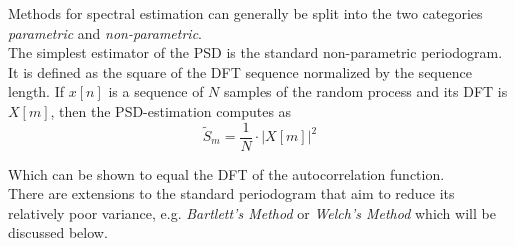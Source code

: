 Methods for spectral estimation can generally be split into the two categories \textit{parametric} and \textit{non-parametric}. \cite{book_2}\\

The simplest estimator of the PSD is the standard non-parametric periodogram. It is defined as the square of the DFT sequence normalized by the sequence length. If $x[n]$ is a sequence of $N$ samples of the random process and its DFT is $X[m]$, then the PSD-estimation computes as \cite{weather_radar}
\[
\tilde{S}_{m} = \frac{1}{N}\cdot|X[m]|^{2}
\]

Which can be shown to equal the DFT of the autocorrelation function. \cite{dsp_tp}\cite{book_2}\\

 There are extensions to the standard periodogram that aim to reduce its relatively poor variance, e.g. \textit{Bartlett's Method} or \textit{Welch's Method} which will be discussed below. \cite{dsp_tp}



